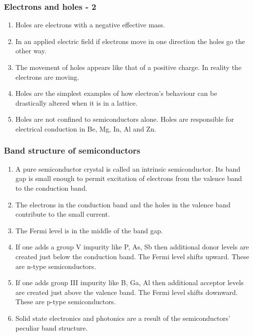 \documentclass{beamer}
\begin{document}
\begin{frame}
\frametitle{Electrons and holes - 2}
\begin{enumerate}
\item Holes are electrons with a negative effective mass.
\item In an applied electric field if electrons move in one direction the holes
go the other way.
\item The movement of holes appears like that of a positive charge. In reality
the electrons are moving.
\item Holes are the simplest examples of how electron's behaviour can be 
drastically altered when it is in a lattice.
\item Holes are not confined to semiconductors alone. Holes are responsible for
electrical conduction in Be, Mg, In, Al and Zn.
\end{enumerate}
\end{frame}

\begin{frame}
\frametitle{Band structure of semiconductors}
\begin{enumerate}
\item A pure semiconductor crystal is called an intrinsic semiconductor. Its 
band gap is small enough to permit excitation of electrons from the valence band
to the conduction band.
\item The electrons in the conduction band and the holes in the valence band 
contribute to the small current. 
\item The Fermi level is in the middle of the band gap.
\item If one adds a group V impurity like P, As, Sb then additional donor levels
are created just below the conduction band. The Fermi level shifts upward. 
These are n-type semiconductors.
\item If one adds group III impurity like B, Ga, Al then additional acceptor 
levels are created just above the valence band. The Fermi level shifts downward.
These are p-type semiconductors.
\item Solid state electronics and photonics are a result of the semiconductors'
peculiar band structure.
\end{enumerate}
\end{frame}
\end{document}

